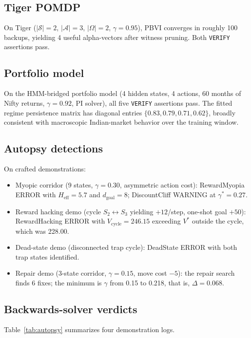\documentclass[conference]{IEEEtran}
\begin{document}
\subsection{Tiger POMDP}

On Tiger ($|\mathcal{S}| = 2$, $|\mathcal{A}| = 3$, $|\Omega| = 2$,
$\gamma = 0.95$), PBVI converges in roughly 100 backups, yielding 4
useful alpha-vectors after witness pruning. Both \texttt{VERIFY}
assertions pass.

\subsection{Portfolio model}

On the HMM-bridged portfolio model (4 hidden states, 4 actions, 60
months of Nifty returns, $\gamma = 0.92$, PI solver), all five
\texttt{VERIFY} assertions pass. The fitted regime persistence
matrix has diagonal entries $\{0.83, 0.79, 0.71, 0.62\}$, broadly
consistent with macroscopic Indian-market behavior over the training
window.

\subsection{Autopsy detections}

On crafted demonstrations:
\begin{itemize}
\item Myopic corridor (9 states, $\gamma = 0.30$, asymmetric action
cost): RewardMyopia ERROR with $H_\text{eff} = 5.7$ and
$d_\text{goal} = 8$; DiscountCliff WARNING at $\gamma^* = 0.27$.
\item Reward hacking demo (cycle $S_2 \leftrightarrow S_3$ yielding
$+12$/step, one-shot goal $+50$): RewardHacking ERROR with
$V_\text{cycle} = 246.15$ exceeding $V^*$ outside the cycle, which
was 228.00.
\item Dead-state demo (disconnected trap cycle): DeadState ERROR
with both trap states identified.
\item Repair demo (3-state corridor, $\gamma = 0.15$, move cost
$-5$): the repair search finds 6 fixes; the minimum is
$\gamma$ from 0.15 to 0.218, that is, $\Delta = 0.068$.
\end{itemize}

\subsection{Backwards-solver verdicts}

Table~\ref{tab:autopsy} summarizes four demonstration logs.
\end{document}
